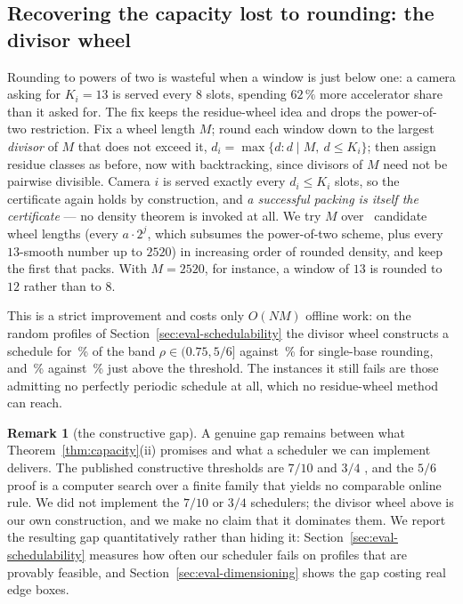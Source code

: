 \documentclass[final,5p,times,twocolumn]{elsarticle}
\theoremstyle{definition}
\newtheorem{remark}[theorem]{Remark}
\newcommand{\Nc}{N}
\newcommand{\dens}{\rho}
\begin{document}
\subsection{Recovering the capacity lost to rounding: the divisor wheel}\label{sec:wheel}
Rounding to powers of two is wasteful when a window is just below one: a camera asking for
$K_i=13$ is served every $8$ slots, spending $62\,\%$ more accelerator share than it asked for.
The fix keeps the residue-wheel idea and drops the power-of-two restriction. Fix a wheel length
$M$; round each window down to the largest \emph{divisor} of $M$ that does not exceed it,
$d_i=\max\{d: d\mid M,\ d\le K_i\}$; then assign residue classes as before, now with
backtracking, since divisors of $M$ need not be pairwise divisible. Camera $i$ is served exactly
every $d_i\le K_i$ slots, so the certificate again holds by construction, and \emph{a successful
packing is itself the certificate} --- no density theorem is invoked at all. We try $M$ over
\numEoneWheelCands\ candidate wheel lengths (every $a\cdot2^j$, which subsumes the power-of-two
scheme, plus every $13$-smooth number up to $2520$) in increasing order of rounded density, and
keep the first that packs. With $M=2520$, for instance, a window of $13$ is rounded to $12$
rather than to $8$.

This is a strict improvement and costs only $O(\Nc M)$ offline work: on the random profiles of
Section~\ref{sec:eval-schedulability} the divisor wheel constructs a schedule for
\numEoneWheelEightPct\,\% of the band $\dens\in(0.75,5/6]$ against \numEoneHarmEightPct\,\% for
single-base rounding, and \numEoneWheelNinePct\,\% against \numEoneHarmNinePct\,\% just above the
threshold. The instances it still fails are those admitting no perfectly periodic schedule at
all, which no residue-wheel method can reach.

\begin{remark}[the constructive gap]\label{rem:gap}
A genuine gap remains between what Theorem~\ref{thm:capacity}(ii) promises and what a scheduler we
can implement delivers. The published constructive thresholds are $7/10$
\cite{chanchin1993schedulers} and $3/4$ \cite{fishburn2002densities}, and the $5/6$ proof is a
computer search over a finite family that yields no comparable online rule. We did not implement
the $7/10$ or $3/4$ schedulers; the divisor wheel above is our own construction, and we make no
claim that it dominates them. We report the resulting gap quantitatively rather than hiding it:
Section~\ref{sec:eval-schedulability} measures how often our scheduler fails on profiles that are
provably feasible, and Section~\ref{sec:eval-dimensioning} shows the gap costing real edge boxes.
\end{remark}
\end{document}

